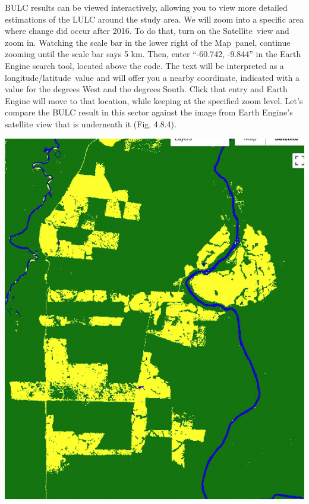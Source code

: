 \documentclass[
  letterpaper,
  DIV=11,
  numbers=noendperiod]{scrreprt}
\begin{document}
BULC results can be viewed interactively, allowing you to view more
detailed estimations of the LULC around the study area. We will zoom
into a specific area where change did occur after 2016. To do that, turn
on the Satellite~view and zoom in. Watching the scale bar in the lower
right of the Map~panel, continue zooming until the scale bar says 5 km.
Then, enter ``-60.742, -9.844'' in the Earth Engine search tool, located
above the code. The text will be interpreted as a
longitude/latitude~value and will offer you a nearby coordinate,
indicated with a value for the degrees West and the degrees South. Click
that entry and Earth Engine will move to that location, while keeping at
the specified zoom level. Let's compare the BULC result in this sector
against the image from Earth Engine's satellite view that is underneath
it (Fig. 4.8.4).

\includegraphics{./F4/image51.png}~
\end{document}
